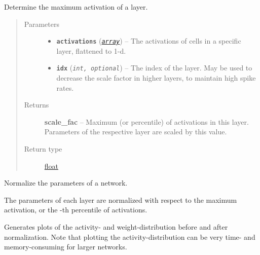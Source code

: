 \documentclass[letterpaper,10pt,english]{sphinxmanual}
\begin{document}

\begin{fulllineitems}
\label{core:core.util.get_scale_fac}
Determine the maximum activation of a layer.
\begin{quote}\begin{description}
\item[{Parameters}] \leavevmode\begin{itemize}
\item {} 
\textbf{\texttt{activations}} (\href{https://docs.python.org/library/array.html\#module-array}{\emph{\texttt{array}}}) -- The activations of cells in a specific layer, flattened to 1-d.

\item {} 
\textbf{\texttt{idx}} (\emph{\texttt{int, optional}}) -- The index of the layer. May be used to decrease the scale factor in
higher layers, to maintain high spike rates.

\end{itemize}

\item[{Returns}] \leavevmode
\textbf{scale\_fac} -- Maximum (or percentile) of activations in this layer.
Parameters of the respective layer are scaled by this value.

\item[{Return type}] \leavevmode
\href{https://docs.python.org/library/functions.html\#float}{float}

\end{description}\end{quote}

\end{fulllineitems}


\begin{fulllineitems}
\label{core:core.util.normalize_parameters}
Normalize the parameters of a network.

The parameters of each layer are normalized with respect to the maximum
activation, or the -th percentile of activations.

Generates plots of the activity- and weight-distribution before and after
normalization. Note that plotting the activity-distribution can be very
time- and memory-consuming for larger networks.

\end{fulllineitems}
\end{document}
